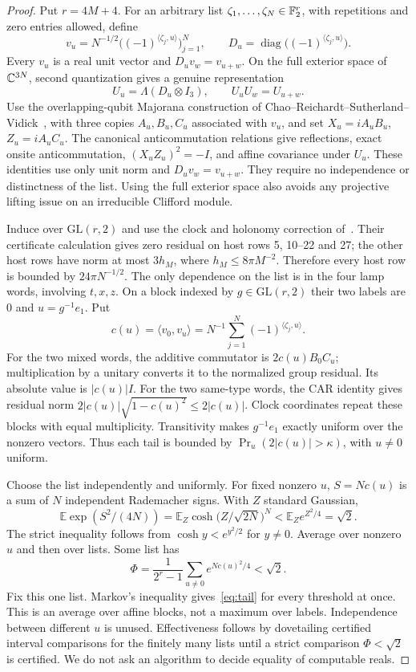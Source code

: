 \begin{proof}
Put $r=4M+4$. For an arbitrary list $\zeta_1,\ldots,\zeta_N\in\mathbb F_2^r$, with repetitions and zero entries allowed, define
\[
 v_u=N^{-1/2}\bigl((-1)^{\langle\zeta_j,u\rangle}\bigr)_{j=1}^N,
 \qquad D_u=\operatorname{diag}\bigl((-1)^{\langle\zeta_j,u\rangle}\bigr).
\]
Every $v_u$ is a real unit vector and $D_uv_w=v_{u+w}$. On the full exterior space of $\mathbb C^{3N}$, second quantization gives a genuine representation
\[
 U_u=\Lambda(D_u\otimes I_3),\qquad U_uU_w=U_{u+w}.
\]
Use the overlapping-qubit Majorana construction of Chao--Reichardt--Sutherland--Vidick~\cite{CRSV}, with three copies $A_u,B_u,C_u$ associated with $v_u$, and set $X_u=iA_uB_u$, $Z_u=iA_uC_u$. The canonical anticommutation relations give reflections, exact onsite anticommutation, $(X_uZ_u)^2=-I$, and affine covariance under $U_u$. These identities use only unit norm and $D_uv_w=v_{u+w}$. They require no independence or distinctness of the list. Using the full exterior space also avoids any projective lifting issue on an irreducible Clifford module.

Induce over $\mathrm{GL}(r,2)$ and use the clock and holonomy correction of~\cite[Section P2]{UP}. Their certificate calculation gives zero residual on host rows 5, 10--22 and 27; the other host rows have norm at most $3h_M$, where $h_M\le8\pi M^{-2}$. Therefore every host row is bounded by $24\pi N^{-1/2}$. The only dependence on the list is in the four lamp words, involving $t,x,z$. On a block indexed by $g\in\mathrm{GL}(r,2)$ their two labels are $0$ and $u=g^{-1}e_1$. Put
\[
 c(u)=\langle v_0,v_u\rangle
      =N^{-1}\sum_{j=1}^N(-1)^{\langle\zeta_j,u\rangle}.
\]
For the two mixed words, the additive commutator is $2c(u)B_0C_u$; multiplication by a unitary converts it to the normalized group residual. Its absolute value is $|c(u)|I$. For the two same-type words, the CAR identity gives residual norm $2|c(u)|\sqrt{1-c(u)^2}\le2|c(u)|$. Clock coordinates repeat these blocks with equal multiplicity. Transitivity makes $g^{-1}e_1$ exactly uniform over the nonzero vectors. Thus each tail is bounded by $\Pr_u(2|c(u)|>\kappa)$, with $u\ne0$ uniform.

Choose the list independently and uniformly. For fixed nonzero $u$, $S=Nc(u)$ is a sum of $N$ independent Rademacher signs. With $Z$ standard Gaussian,
\[
 \mathbb E\exp(S^2/(4N))
 =\mathbb E_Z\cosh\bigl(Z/\sqrt{2N}\bigr)^N
 <\mathbb E_Z e^{Z^2/4}=\sqrt2.
\]
The strict inequality follows from $\cosh y<e^{y^2/2}$ for $y\ne0$. Average over nonzero $u$ and then over lists. Some list has
\[
 \Phi=\frac1{2^r-1}\sum_{u\ne0}e^{Nc(u)^2/4}<\sqrt2.
\]
Fix this one list. Markov's inequality gives~\eqref{eq:tail} for every threshold at once. This is an average over affine blocks, not a maximum over labels. Independence between different $u$ is unused. Effectiveness follows by dovetailing certified interval comparisons for the finitely many lists until a strict comparison $\Phi<\sqrt2$ is certified. We do not ask an algorithm to decide equality of computable reals.


\end{proof}
